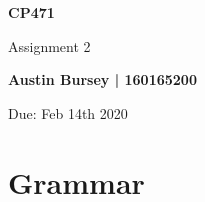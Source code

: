 \documentclass[fleqn]{article}
\begin{document}
\begin{titlepage}
   \begin{center}
       \vspace*{1cm}
 
       \textbf{CP471}
 
       \vspace{0.5cm}
        Assignment 2 
 
       \vspace{1.5cm}
 
       \textbf{Austin Bursey | 160165200}
 
       \vfill
        Due: Feb 14th 2020
 
       \vspace{0.8cm}
 


 
   \end{center}
   
    
\end{titlepage}  
   
   
\section{Grammar}
\end{document}
